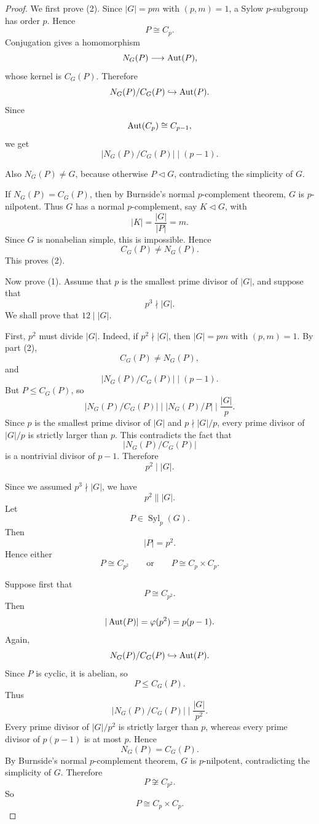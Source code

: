 \begin{proof}
We first prove (2). Since $|G|=pm$ with $(p,m)=1$, a Sylow $p$-subgroup has order $p$. Hence
\[
    P\cong C_p.
\]
Conjugation gives a homomorphism
\[
    N_G(P)\longrightarrow \operatorname{Aut}(P),
\]
whose kernel is $C_G(P)$. Therefore
\[
    N_G(P)/C_G(P)\hookrightarrow \operatorname{Aut}(P).
\]
Since
\[
    \operatorname{Aut}(C_p)\cong C_{p-1},
\]
we get
\[
    \left|N_G(P)/C_G(P)\right|\mid (p-1).
\]

Also $N_G(P)\neq G$, because otherwise $P\lhd G$, contradicting the simplicity of $G$.

If $N_G(P)=C_G(P)$, then by Burnside's normal $p$-complement theorem, $G$ is $p$-nilpotent. Thus $G$ has a normal $p$-complement, say $K\lhd G$, with
\[
    |K|=\frac{|G|}{|P|}=m.
\]
Since $G$ is nonabelian simple, this is impossible. Hence
\[
    C_G(P)\neq N_G(P).
\]
This proves (2).

Now prove (1). Assume that $p$ is the smallest prime divisor of $|G|$, and suppose that
\[
    p^3\nmid |G|.
\]
We shall prove that $12\mid |G|$.

First, $p^2$ must divide $|G|$. Indeed, if $p^2\nmid |G|$, then $|G|=pm$ with $(p,m)=1$. By part (2),
\[
    C_G(P)\neq N_G(P),
\]
and
\[
    \left|N_G(P)/C_G(P)\right|\mid (p-1).
\]
But $P\leq C_G(P)$, so
\[
    \left|N_G(P)/C_G(P)\right|
    \mid
    \left|N_G(P)/P\right|
    \mid
    \frac{|G|}{p}.
\]
Since $p$ is the smallest prime divisor of $|G|$ and $p\nmid |G|/p$, every prime divisor of $|G|/p$ is strictly larger than $p$. This contradicts the fact that
\[
    \left|N_G(P)/C_G(P)\right|
\]
is a nontrivial divisor of $p-1$. Therefore
\[
    p^2\mid |G|.
\]

Since we assumed $p^3\nmid |G|$, we have
\[
    p^2\parallel |G|.
\]
Let
\[
    P\in \operatorname{Syl}_p(G).
\]
Then
\[
    |P|=p^2.
\]
Hence either
\[
    P\cong C_{p^2}
    \qquad\text{or}\qquad
    P\cong C_p\times C_p.
\]

Suppose first that
\[
    P\cong C_{p^2}.
\]
Then
\[
    |\operatorname{Aut}(P)|=\varphi(p^2)=p(p-1).
\]
Again,
\[
    N_G(P)/C_G(P)\hookrightarrow \operatorname{Aut}(P).
\]
Since $P$ is cyclic, it is abelian, so
\[
    P\leq C_G(P).
\]
Thus
\[
    \left|N_G(P)/C_G(P)\right|
    \mid
    \frac{|G|}{p^2}.
\]
Every prime divisor of $|G|/p^2$ is strictly larger than $p$, whereas every prime divisor of $p(p-1)$ is at most $p$. Hence
\[
    N_G(P)=C_G(P).
\]
By Burnside's normal $p$-complement theorem, $G$ is $p$-nilpotent, contradicting the simplicity of $G$. Therefore
\[
    P\not\cong C_{p^2}.
\]
So
\[
    P\cong C_p\times C_p.
\]


\end{proof}
